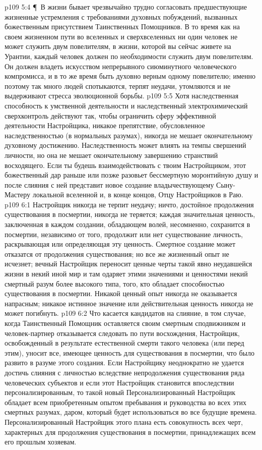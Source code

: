 \vs p109 5:4 \P\ В жизни бывает чрезвычайно трудно согласовать предшествующие жизненные устремления с требованиями духовных побуждений, вызванных божественным присутствием Таинственных Помощников. В то время как на своем жизненном пути во вселенных и сверхвселенных ни один человек не может служить двум повелителям, в жизни, которой вы сейчас живете на Урантии, каждый человек должен по необходимости служить двум повелителям. Он должен владеть искусством непрерывного сиюминутного человеческого компромисса, и в то же время быть духовно верным одному повелителю; именно поэтому так много людей спотыкаются, терпят неудачи, утомляются и не выдерживают стресса эволюционной борьбы.
\vs p109 5:5 Хотя наследственная способность к умственной деятельности и наследственный электрохимический сверхконтроль действуют так, чтобы ограничить сферу эффективной деятельности Настройщика, никакое препятствие, обусловленное наследственностью (в нормальных разумах), никогда не мешает окончательному духовному достижению. Наследственность может влиять на темпы свершений личности, но она не мешает окончательному завершению странствий восходящего. Если ты будешь взаимодействовать с твоим Настройщиком, этот божественный дар раньше или позже разовьет бессмертную моронтийную душу и после слияния с ней представит новое создание владычествующему Сыну\hyp{}Мастеру локальной вселенной и, в конце концов, Отцу Настройщиков в Раю.
\vs p109 6:1 Настройщик никогда не терпит неудачу; ничто, достойное продолжения существования в посмертии, никогда не теряется; каждая значительная ценность, заключенная в каждом создании, обладающем волей, несомненно, сохранится в посмертии, независимо от того, продолжит или нет существование личность, раскрывающая или определяющая эту ценность. Смертное создание может отказатся от продолжения существования; но все же жизненный опыт не исчезнет; вечный Настройщик переносит ценные черты такой явно неудавшейся жизни в некий иной мир и там одаряет этими значениями и ценностями некий смертный разум более высокого типа, того, кто обладает способностью существования в посмертии. Никакой ценный опыт никогда не оказывается напрасным; никакое истинное значение или действительная ценность никогда не может погибнуть.
\vs p109 6:2 Что касается кандидатов на слияние, в том случае, когда Таинственный Помощник оставляется своим смертным сподвижником и человек\hyp{}партнер отказывается следовать по пути восхождения, Настройщик, освобожденный в результате естественной смерти такого человека (или перед этим), уносит все, имеющее ценность для существования в посмертии, что было развито в разуме этого создания. Если Настройщику неоднократно не удается достичь слияния с личностью вследствие непродолжения существования ряда человеческих субъектов и если этот Настройщик становится впоследствии персонализированным, то такой новый Персонализированный Настройщик обладает всем приобретенным опытом пребывания и руководства во всех этих смертных разумах, даром, который будет использоваться во все будущие времена. Персонализированный Настройщик этого плана есть совокупность всех черт, характерных для продолжения существования в посмертии, принадлежащих всем его прошлым хозяевам.
